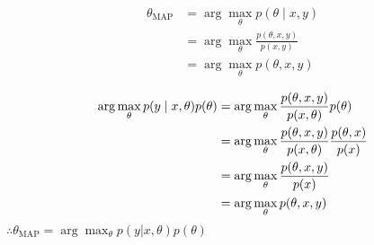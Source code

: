 \begin{answer}

    $$
        \begin{aligned}
            \theta_{\text{MAP}} 
            &= \arg\max_\theta p(\theta \mid x, y) \\
            &= \arg\max_\theta \frac{p(\theta, x, y)}{p(x, y)} \\
            &= \arg\max_\theta p(\theta, x, y) \\
        \end{aligned}
    $$
    $$
        \\ \begin{aligned} 
            \arg\max_\theta p(y\mid x, \theta) p(\theta) 
            &= \arg\max_\theta\frac{p(\theta, x, y)}{p(x, \theta)}p(\theta) \\
            &= \arg\max_\theta\frac{p(\theta, x, y)}{p(x, \theta)}\frac{p(\theta, x)}{p(x)}\\
            &= \arg\max_\theta\frac{p(\theta, x, y)}{p(x)} \\
            &= \arg\max_\theta p(\theta, x, y) \\
        \end{aligned}
    $$
    $\therefore \theta_{\text{MAP}} =\arg\max_\theta p(y|x, \theta) p(\theta)$ 
\end{answer}
